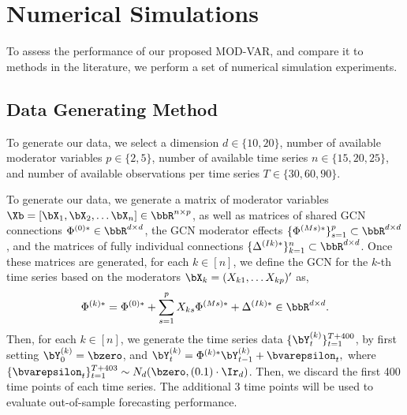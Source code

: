 \section{Numerical Simulations}\label{section:simulations}  

To assess the performance of our proposed MOD-VAR, and compare it to methods in the literature, we perform a set of numerical simulation experiments. 

\subsection{Data Generating Method}


To generate our data, we select a dimension $d\in \{10,20\}$, number of available moderator variables $p \in \{2,5\}$, number of available time series $n\in\{15,20,25\}$, and number of available observations per time series $T \in\{30,60,90\}$.

To generate our data, we generate a matrix of moderator variables $\Xb = [\bX_1, \bX_2,\ldots \bX_{n}]\in\bbR^{n \times p}$, as well as matrices of shared GCN connections $\Phi^{(0)*}\in\bbR^{d\times d}$, the GCN moderator effects $\{\Phi^{(Ms)*}\}_{s=1}^p\subset\bbR^{d\times d}$, and the matrices of fully individual connections $\{\Delta^{(Ik)*}\}_{k=1}^n \subset \bbR^{d\times d}$. Once these matrices are generated, for each $k\in[n]$, we define the GCN for the $k$-th time series based on the moderators $\bX_k = (X_{k1},\ldots X_{kp})'$ as,
\begin{align*}
	\Phi^{(k)*} = \Phi^{(0)*} + \sum_{s=1}^p X_{ks} \Phi^{(Ms)*} + \Delta^{(Ik)*}\in\bbR^{d\times d}.
\end{align*}
Then, for each $k\in[n]$, we generate the time series data $\{\bY^{(k)}_t\}_{t=1}^{T+400}$, by first setting $\bY^{(k)}_0 = \bzero$, and 
$ \bY^{(k)}_{t} = \Phi^{(k)*} \bY^{(k)}_{t-1} + \bvarepsilon_t , $
where $\{\bvarepsilon_{t}\}_{t=1}^{T+403}\sim N_d(\bzero, (0.1)\cdot \Ir_d)$. Then, we discard the first 400 time points of each time series. The additional 3 time points will be used to evaluate out-of-sample forecasting performance. 

